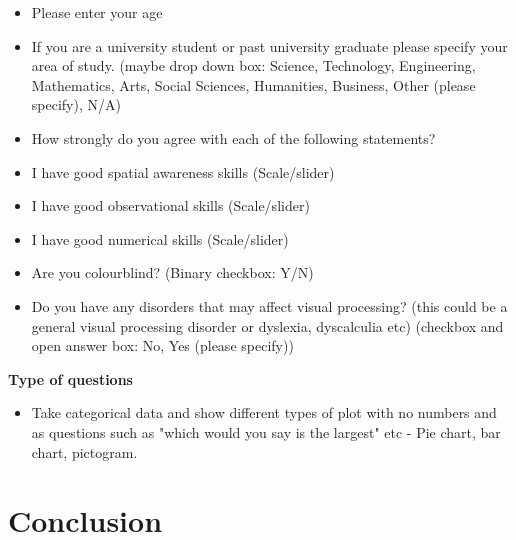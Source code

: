 \begin{itemize}
    \item Please enter your age
    
    \item If you are a university student or past university graduate please specify your area of study. (maybe drop down box: Science, Technology, Engineering, Mathematics, Arts, Social Sciences, Humanities, Business, Other (please specify), N/A)

    \item How strongly do you agree with each of the following statements?

    \item I have good spatial awareness skills (Scale/slider)
    
    \item I have good observational skills (Scale/slider)
    
    \item I have good numerical skills (Scale/slider)
    
    \item Are you colourblind? (Binary checkbox: Y/N)
    
    \item Do you have any disorders that may affect visual processing? (this could be a general visual processing disorder 
    or dyslexia, dyscalculia etc)
    (checkbox and open answer box: No, Yes (please specify))
\end{itemize}

\noindent \textbf{Type of questions}

\begin{itemize}
    \item Take categorical data and show different types of plot with no numbers and as questions such as "which would you 
    say is the largest" etc - Pie chart, bar chart, pictogram.
\end{itemize}


\section{Conclusion}

